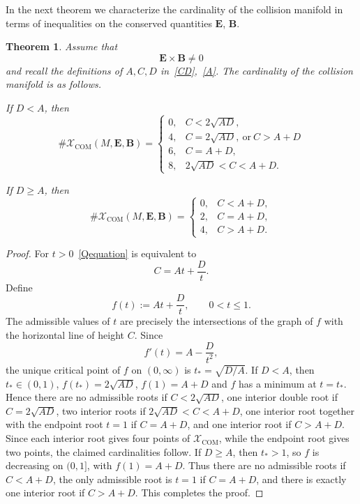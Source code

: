 \documentclass[10pt,a4paper]{amsart}
\newtheorem{theorem}{Theorem}[section]
\begin{document}
In the next theorem we characterize the cardinality of the collision manifold in terms of inequalities on the conserved quantities ${\bm E}$, ${\bm B}$. 



\begin{theorem}\label{cardinalitytheorem}
Assume that 
\[
{\bm E}\times{\bm B}\neq0
\]
 and recall the definitions of $A,C,D$ in~\eqref{CD},~\eqref{A}. 
The cardinality of the collision manifold is as follows.

If $D<A$, then
\[
\#\mathcal X_{\mathrm{COM}}(M,{\bm E},{\bm B})
=
\begin{cases}
0, & C<2\sqrt{AD},\\
4, & C=2\sqrt{AD},\ \text{or}\ C>A+D\\
6, & C=A+D,\\
8, & 2\sqrt{AD}<C<A+D.
\end{cases}
\]


If $D\geq A$, then
\[
\#\mathcal X_{\mathrm{COM}}(M,{\bm E},{\bm B})
=
\begin{cases}
0, & C<A+D,\\
2, & C=A+D,\\
4, & C>A+D.
\end{cases}
\]
\end{theorem}

\begin{proof}
For $t>0$~\eqref{Qequation}
is equivalent to
\[
C=At+\frac{D}{t}.
\]
Define
\[
f(t):=At+\frac{D}{t},
\qquad 0<t\le1.
\]
The admissible values of $t$ are precisely the intersections of the graph of $f$ with the horizontal line of height $C$.
Since
\[
f'(t)=A-\frac{D}{t^2},
\]
the unique critical point of $f$ on $(0,\infty)$ is $t_*=\sqrt{D/A}$. 
If $D<A$, then $
t_*\in(0,1)$, $f(t_*)=2\sqrt{AD}$, $f(1)=A+D$
and $f$ has a minimum at $t=t_*$. Hence there are no admissible roots if $C<2\sqrt{AD}$, one interior double root if $C=2\sqrt{AD}$, two interior roots if $2\sqrt{AD}<C<A+D$, one interior root together with the endpoint root $t=1$ if $C=A+D$, and one interior root if $C>A+D$. Since each interior root gives four points of $\mathcal X_{\mathrm{COM}}$, while the endpoint root gives two points, the claimed cardinalities follow.
If $D\geq A$, then $t_*>1$, so $f$ is decreasing on $(0,1]$, with $
f(1)=A+D$.
Thus there are no admissible roots if $C<A+D$, the only admissible root is $t=1$ if $C=A+D$, and there is exactly one interior root if $C>A+D$. This completes the proof.
\end{proof}
\end{document}
